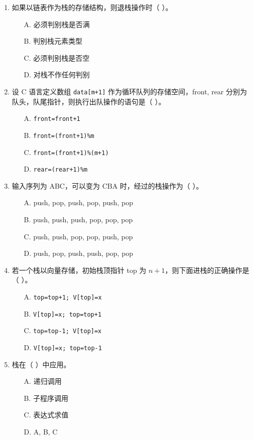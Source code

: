 \documentclass[12pt, a4paper]{article}
\begin{document}
\begin{enumerate}
    \item 如果以链表作为栈的存储结构，则退栈操作时（ ）。
    \begin{enumerate}
        \item[A.] 必须判别栈是否满
        \item[B.] 判别栈元素类型
        \item[C.] 必须判别栈是否空
        \item[D.] 对栈不作任何判别
    \end{enumerate}
    
    \item 设 C 语言定义数组 \texttt{data[m+1]} 作为循环队列的存储空间，front, rear 分别为队头，队尾指针，则执行出队操作的语句是（ ）。
    \begin{enumerate}
        \item[A.] \texttt{front=front+1}
        \item[B.] \texttt{front=(front+1)\%m}
        \item[C.] \texttt{front=(front+1)\%(m+1)}
        \item[D.] \texttt{rear=(rear+1)\%m}
    \end{enumerate}
    
    \item 输入序列为 ABC，可以变为 CBA 时，经过的栈操作为（ ）。
    \begin{enumerate}
        \item[A.] push, pop, push, pop, push, pop
        \item[B.] push, push, push, pop, pop, pop
        \item[C.] push, push, pop, pop, push, pop
        \item[D.] push, pop, push, push, pop, pop
    \end{enumerate}
    
    \item 若一个栈以向量存储，初始栈顶指针 top 为 $n+1$，则下面进栈的正确操作是（ ）。
    \begin{enumerate}
        \item[A.] \texttt{top=top+1; V[top]=x}
        \item[B.] \texttt{V[top]=x; top=top+1}
        \item[C.] \texttt{top=top-1; V[top]=x}
        \item[D.] \texttt{V[top]=x; top=top-1}
    \end{enumerate}
    
    \item 栈在（ ）中应用。
    \begin{enumerate}
        \item[A.] 递归调用
        \item[B.] 子程序调用
        \item[C.] 表达式求值
        \item[D.] A, B, C
    \end{enumerate}
    

\end{enumerate}
\end{document}

